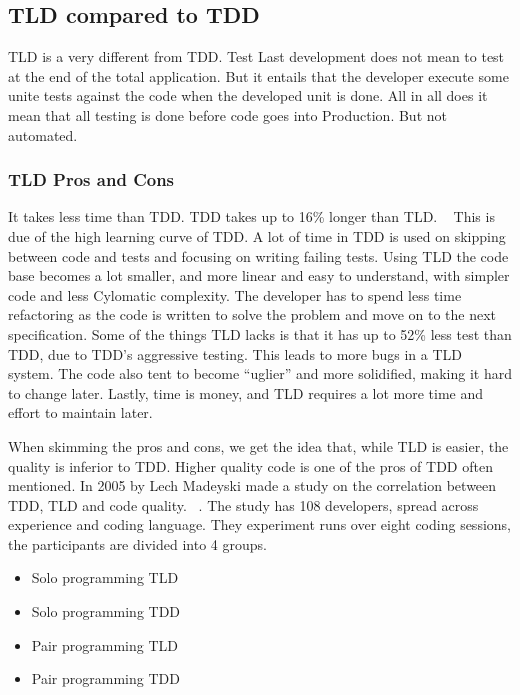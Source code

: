 \subsection{TLD compared to TDD}

TLD is a very different from TDD. Test Last development does not mean to test at the end of the total application.
But it entails that the developer execute some unite tests against the code when the developed unit is done. 
All in all does it mean that all testing is done before code goes into Production. But not automated.~\cite{gm2011}\newline



\subsubsection{TLD Pros and Cons}
It takes less time than TDD. TDD takes up to 16\% longer than TLD.
~\cite{bl2003} This is due of the high learning curve of TDD. 
A lot of time in TDD is used on skipping between code and tests and focusing on writing failing tests. 
Using TLD the code base becomes a lot smaller, and more linear and easy to understand, 
with simpler code and less Cylomatic complexity. 
The developer has to spend less time refactoring as the code is written to solve the problem and move on to the next specification. 
Some of the things TLD lacks is that it has up to 52\% less test than TDD, 
due to TDD’s aggressive testing. This leads to more bugs in a TLD system. 
The code also tent to become “uglier” and more solidified, making it hard to change later. 
Lastly, time is money, and TLD requires a lot more time and effort to maintain later.~\cite{ss2014}\newline

When skimming the pros and cons, we get the idea that, 
while TLD is easier, the quality is inferior to TDD. 
Higher quality code is one of the pros of TDD often mentioned. 
In 2005 by Lech Madeyski made a study on the correlation between TDD, 
TLD and code quality. ~\cite{lm2005}. The study has 108 developers, 
spread across experience and coding language. 
They experiment runs over eight coding sessions, the participants are divided into 4 groups.
\begin{itemize}
    \item Solo programming TLD
    \item Solo programming TDD
    \item Pair programming TLD
    \item Pair programming TDD
\end{itemize}

